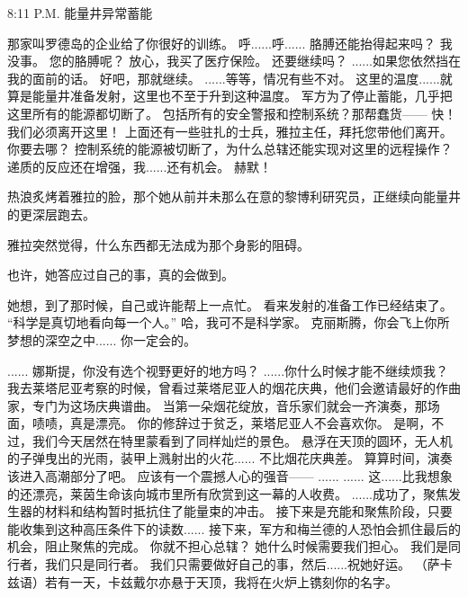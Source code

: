 \documentclass[openany]{book}
\begin{document}
8:11 P.M. 能量井异常蓄能
\begin{dialogue}
     那家叫罗德岛的企业给了你很好的训练。
     呼......呼......
     胳膊还能抬得起来吗？
     我没事。
     您的胳膊呢？
     放心，我买了医疗保险。
     还要继续吗？
     ......如果您依然挡在我的面前的话。
     好吧，那就继续。
     ......等等，情况有些不对。
     这里的温度......就算是能量井准备发射，这里也不至于升到这种温度。
     军方为了停止蓄能，几乎把这里所有的能源都切断了。
     包括所有的安全警报和控制系统？那帮蠢货——
     快！我们必须离开这里！
     上面还有一些驻扎的士兵，雅拉主任，拜托您带他们离开。
     你要去哪？
     控制系统的能源被切断了，为什么总辖还能实现对这里的远程操作？
     递质的反应还在增强，我......还有机会。
     赫默！\par
    热浪炙烤着雅拉的脸，那个她从前并未那么在意的黎博利研究员，正继续向能量井的更深层跑去。\par
    雅拉突然觉得，什么东西都无法成为那个身影的阻碍。\par
    也许，她答应过自己的事，真的会做到。\par
    她想，到了那时候，自己或许能帮上一点忙。
     看来发射的准备工作已经结束了。
     “科学是真切地看向每一个人。”
     哈，我可不是科学家。
     克丽斯腾，你会飞上你所梦想的深空之中......
     你一定会的。
\end{dialogue}

\begin{dialogue}
     ......
     娜斯提，你没有选个视野更好的地方吗？
     ......你什么时候才能不继续烦我？
     我去莱塔尼亚考察的时候，曾看过莱塔尼亚人的烟花庆典，他们会邀请最好的作曲家，专门为这场庆典谱曲。
     当第一朵烟花绽放，音乐家们就会一齐演奏，那场面，啧啧，真是漂亮。
     你的修辞过于贫乏，莱塔尼亚人不会喜欢你。
     是啊，不过，我们今天居然在特里蒙看到了同样灿烂的景色。
     悬浮在天顶的圆环，无人机的子弹曳出的光雨，装甲上溅射出的火花......
     不比烟花庆典差。
     算算时间，演奏该进入高潮部分了吧。
     应该有一个震撼人心的强音——
     ......
     ......
     这......比我想象的还漂亮，莱茵生命该向城市里所有欣赏到这一幕的人收费。
     ......成功了，聚焦发生器的材料和结构暂时抵抗住了能量束的冲击。
     接下来是充能和聚焦阶段，只要能收集到这种高压条件下的读数......
     接下来，军方和梅兰德的人恐怕会抓住最后的机会，阻止聚焦的完成。
     你就不担心总辖？
     她什么时候需要我们担心。
     我们是同行者，我们只是同行者。
     我们只需要做好自己的事，然后......祝她好运。
     （萨卡兹语）若有一天，卡兹戴尔亦悬于天顶，我将在火炉上镌刻你的名字。
\end{dialogue}
\end{document}
